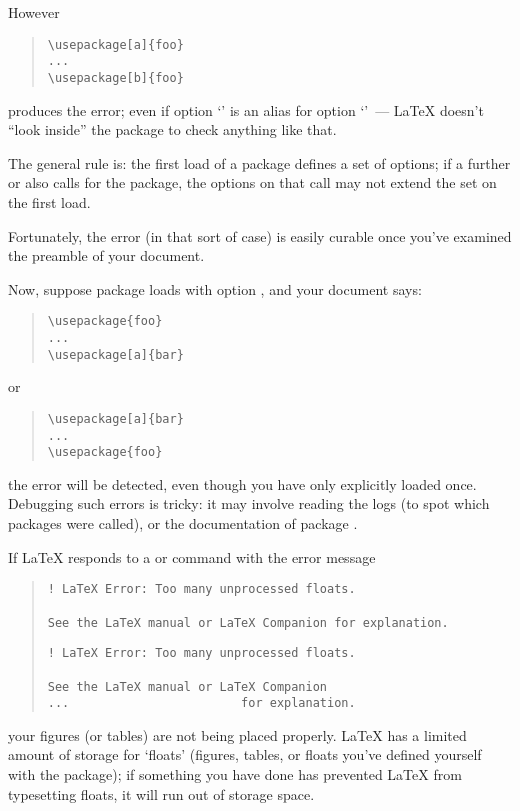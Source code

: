 However
\begin{quote}
\begin{verbatim}
\usepackage[a]{foo}
...
\usepackage[b]{foo}
\end{verbatim}
\end{quote}
produces the error; even if option `' is an alias for
option `'~--- \LaTeX{} doesn't ``look inside'' the package
to check anything like that.

The general rule is: the first load of a package defines a set of
options; if a further  or  also
calls for the package, the options on that call may not extend the set
on the first load.

Fortunately, the error (in that sort of case) is easily curable
once you've examined the preamble of your document.

Now, suppose package  loads  with option
, and your document says:
\begin{quote}
\begin{verbatim}
\usepackage{foo}
...
\usepackage[a]{bar}
\end{verbatim}
\end{quote}
or
\begin{quote}
\begin{verbatim}
\usepackage[a]{bar}
...
\usepackage{foo}
\end{verbatim}
\end{quote}
the error will be detected, even though you have only explicitly
loaded  once.  Debugging such errors is tricky: it may
involve reading the logs (to spot which packages were called), or the
documentation of package .


If \LaTeX{} responds to a  or
 command with the error message
\begin{quote}
\begin{wideversion}
\begin{verbatim}
! LaTeX Error: Too many unprocessed floats.

See the LaTeX manual or LaTeX Companion for explanation.
\end{verbatim}
\end{wideversion}
\begin{narrowversion}
\begin{verbatim}
! LaTeX Error: Too many unprocessed floats.

See the LaTeX manual or LaTeX Companion
...                        for explanation.
\end{verbatim}
\end{narrowversion}
\end{quote}
your figures (or tables) are not being placed properly.  \LaTeX{}
has a limited amount of storage for `floats' (figures, tables, or
floats you've defined yourself with the  package); if
something you have done has prevented \LaTeX{} from typesetting
floats, it will run out of storage space.

